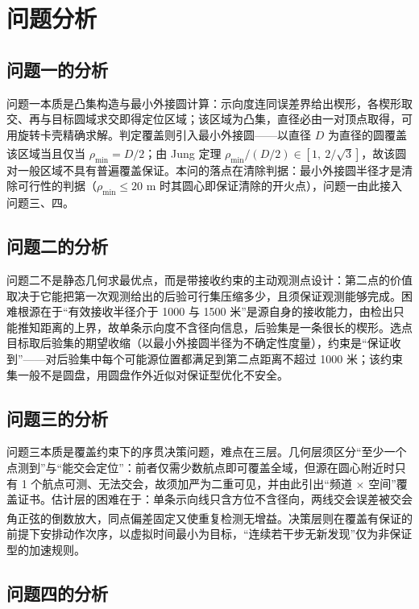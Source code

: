 \documentclass[12pt,a4paper]{ctexart}
\renewcommand{\heiti}{\CJKfamily{zhhei}}
\newcommand{\upcite}[1]{\textsuperscript{\cite{#1}}}
\begin{document}
\FloatBarrier

\section{问题分析}

\subsection{问题一的分析}

问题一本质是凸集构造与最小外接圆计算：示向度连同误差界给出楔形，各楔形取交、再与目标圆域求交即得定位区域；该区域为凸集，直径必由一对顶点取得，可用旋转卡壳精确求解。判定覆盖则引入最小外接圆——以直径 $D$ 为直径的圆覆盖该区域当且仅当 $\rho_{\min}=D/2$；由 Jung\upcite{ref:Jung} 定理 $\rho_{\min}/(D/2)\in[1,\ 2/\sqrt3]$，故该圆对一般区域{\heiti 不具有普遍覆盖保证}。本问的落点在清除判据：最小外接圆半径才是清除可行性的判据（$\rho_{\min}\le20$ m 时其圆心即保证清除的开火点），问题一由此接入问题三、四。

\subsection{问题二的分析}

问题二不是静态几何求最优点，而是带接收约束的主动观测点设计：第二点的价值取决于它能把第一次观测给出的后验可行集压缩多少，且须保证观测能够完成。困难根源在于“有效接收半径介于 1000 与 1500 米”是源自身的接收能力，由检出只能推知距离的{\heiti 上界}，故单条示向度不含径向信息，后验集是一条很长的楔形。选点目标取后验集的期望收缩（以最小外接圆半径为不确定性度量），约束是“保证收到”——对后验集中每个可能源位置都满足到第二点距离不超过 1000 米；该约束集一般不是圆盘，用圆盘作外近似对保证型优化不安全。

\subsection{问题三的分析}

问题三本质是覆盖约束下的序贯决策问题，难点在三层。几何层须区分“至少一个点测到”与“能交会定位”：前者仅需少数航点即可覆盖全域，但源在圆心附近时只有 1 个航点可测、无法交会，故须加严为二重可见，并由此引出“频道 $\times$ 空间”覆盖证书。估计层的困难在于：单条示向线只含方位不含径向，两线交会误差被交会角正弦的倒数放大\upcite{ref:Chen2025}，同点偏差固定又使重复检测无增益。决策层则在覆盖有保证的前提下安排动作次序，以虚拟时间最小为目标，“连续若干步无新发现”仅为非保证型的加速规则。

\subsection{问题四的分析}
\end{document}
